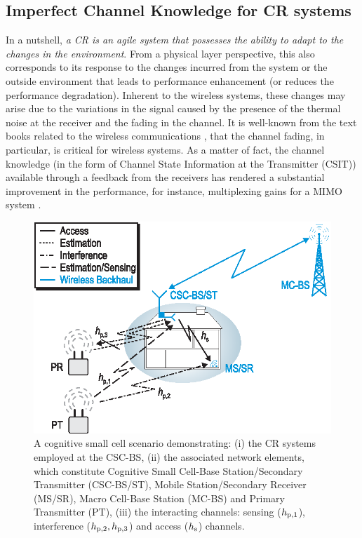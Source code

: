 \subsection{Imperfect Channel Knowledge for CR systems}

In a nutshell, \textit{a CR is an agile system that possesses the ability to adapt to the changes in the environment}. From a physical layer perspective, this also corresponds to its response to the changes incurred from the system or the outside environment that leads to performance enhancement (or reduces the performance degradation). Inherent to the wireless systems, these changes may arise due to the variations in the signal caused by the presence of the thermal noise at the receiver and the fading in the channel. It is well-known from the text books related to the wireless communications \cite{simon2005, Goldsmith05, Tse05}, that the channel fading, in particular, is critical for wireless systems. As a matter of fact, the channel knowledge (in the form of Channel State Information at the Transmitter (CSIT)) available through a feedback from the receivers has rendered a substantial improvement in the performance, for instance, multiplexing gains for a MIMO system \cite{Ali12}. 


\begin{figure}[!t]
\centering
\includegraphics[width = \figscalet]{figures/CR_Scenario_Hybrid}
\caption{A cognitive small cell scenario demonstrating: (i) the CR systems employed at the CSC-BS, (ii) the associated network elements, which constitute Cognitive Small Cell-Base Station/Secondary Transmitter (CSC-BS/ST), Mobile Station/Secondary Receiver (MS/SR), Macro Cell-Base Station (MC-BS) and Primary Transmitter (PT), (iii) the interacting channels: sensing ($h_{\text{p,1}}$), interference ($h_{\text{p,2}}, h_{\text{p,3}}$) and access ($h_{\text{s}}$) channels.}
\label{fig_Int:scenario}
\end{figure}


